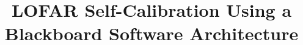 \documentclass[11pt,twoside]{article}  %
\begin{document}

%
%


%

\title{LOFAR Self-Calibration Using a Blackboard Software Architecture}

%
%
%
%
%

\end{document}
